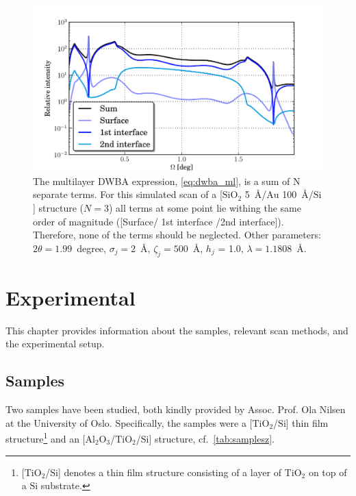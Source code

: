 \documentclass[10pt,twoside, b5paper,pdftex]{report}
\newcommand{\chem}[1]{\ensuremath{\mathrm{#1}}}
\begin{document}
\begin{figure}[htbp]
	\begin{center}
		\includegraphics[width=1.0\textwidth]{figures/contributions_mad.pdf}
	\end{center}
	\caption{The multilayer DWBA expression, \cref{eq:dwba_ml}, is a sum of N separate terms. For this  simulated scan of a [\chem{SiO_2} \SI{5}{\angstrom}/\chem{Au} \SI{100}{\angstrom}/\chem{Si}] structure ($N = 3$) all terms at some point lie withing the same order of magnitude ([Surface/ 1st interface /2nd interface]). Therefore, none of the terms should be neglected. Other parameters: $2\theta = 1.99$~\si{degree}, $\sigma_j = 2$~\si{\angstrom}, $\zeta_j = 500$~\si{\angstrom}, $h_j$ = 1.0, $\lambda = 1.1808$~\si{\angstrom}.\label{fig:contributions_mad}}
\end{figure}







\chapter{Experimental \label{chap:experiment}}
This chapter provides information about the samples,  relevant scan methods, and the experimental setup.


\section{Samples \label{sec:samples}}
Two samples have been studied, both kindly provided by Assoc. Prof. Ola Nilsen at the University of Oslo. Specifically, the samples were a [\chem{TiO_2}/\chem{Si}] thin film structure\footnote{[\chem{TiO_2}/\chem{Si}] denotes a thin film structure consisting of a layer of \chem{TiO_2} on top of a \chem{Si} substrate.} and an [\chem{Al_2O_3}/\chem{TiO_2}/\chem{Si}] structure, cf.~\cref{tab:samplesz}. 
\end{document}
